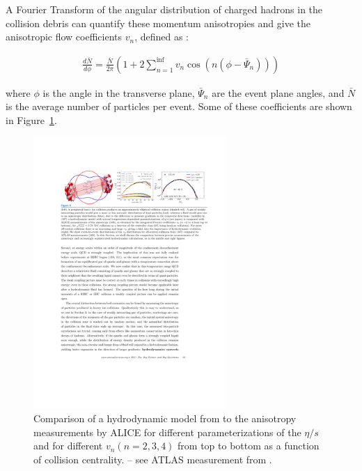 
A Fourier Transform of the angular distribution of charged hadrons in the collision debris can quantify these momentum anisotropies and give the anisotropic flow coefficients $v_n$, defined as \cite{115}:

\begin{align}
\frac{d\bar{N}}{d\phi} = \frac{\bar{N}}{2\pi} \left( 1 + 2 \sum_{n=1}^{\inf} v_{n} \cos(n(\phi-\bar{\Psi}_n)) \right)
\end{align}

where $\phi$ is the angle in the transverse plane, $\bar{\Psi}_n$ are the event plane angles, and $\bar{N}$ is the average number of particles per event. Some of these coefficients are shown in Figure~\ref{fig:flow_coeff}.


\begin{figure}[htbp]
\begin{center}
\includegraphics[width=0.65\textwidth]{figures/theory/flow_coefficients}
\caption{Comparison of a hydrodynamic model from \cite{107} to the anisotropy measurements by ALICE \cite{108} for different parameterizations of the $\eta/s$ and for different $v_n (n = 2, 3, 4)$ from top to bottom as a function of collision centrality.  -- see ATLAS measurement from \cite{109}.}
\label{fig:flow_coeff}
\end{center}
\end{figure}


